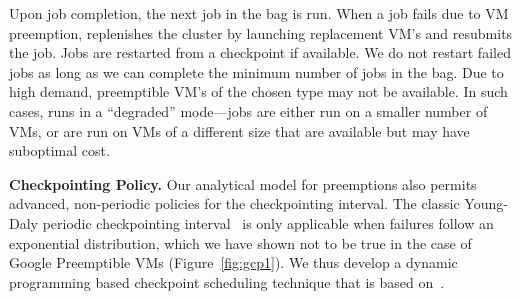 Upon job completion, the next job in the bag is run. 
When a job fails due to VM preemption, \sysname replenishes the cluster by launching replacement VM's and resubmits the job. 
Jobs are restarted from a checkpoint if available. 
We do not restart failed jobs as long as we can complete the minimum number of jobs in the bag.
Due to high demand, preemptible VM's of the chosen type may not be available.
In such cases, \sysname runs in a ``degraded'' mode---jobs are either run on a smaller number of VMs, or are run on VMs of a different size that are available but may have suboptimal cost.  


\noindent \textbf{Checkpointing Policy.} Our analytical model for preemptions also permits advanced, non-periodic policies for the checkpointing interval.
The classic Young-Daly periodic checkpointing interval~\cite{daly2006higher} is only applicable when failures follow an exponential distribution, which we have shown not to be true in the case of Google Preemptible VMs (Figure~\ref{fig:gcp1}).
We thus develop a dynamic programming based checkpoint scheduling technique that is based on~\cite{bougeret_checkpointing_2011}.  

